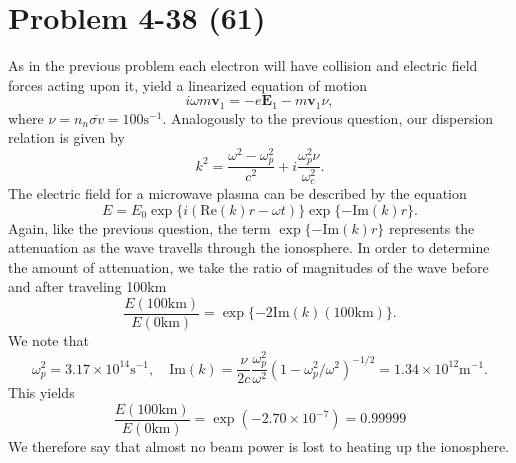 \section*{Problem 4-38 (61)}
\label{sec:4-38}
As in the previous problem each electron will have collision and electric field forces acting upon it, yield a linearized equation of motion
\begin{equation*}
i\omega m \bm{v}_1 = -e\bm{E}_1 - m \bm{v}_1\nu,
\end{equation*}
where \(\nu = n_n\overline{\sigma v} =100\text{s}^{-1}\). Analogously to the previous question, our dispersion relation is given by
\begin{equation*}
	k^2 = \dfrac{\omega^2 - \omega^2_p}{c^2} + i\dfrac{\omega^2_p\nu}{\omega^2_c}.
\end{equation*}
The electric field for a microwave plasma can be described by the equation
\begin{equation*}
	E = E_0\exp\{i\left(\text{Re}(k)r - \omega t \right) \}\exp\{-\text{Im}(k)r \}.
\end{equation*}
Again, like the previous question, the term \(\exp\{-\text{Im}(k)r \} \) represents the attenuation as the wave travells through the ionosphere. In order to determine the amount of attenuation, we take the ratio of magnitudes of the wave before and after traveling 100km 
\begin{equation*}
	\dfrac{E(100\text{km})}{E(0\text{km})} = \exp\{-2\text{Im}(k)(100\text{km}) \}.
\end{equation*}
We note that 
\begin{equation*}
	\omega^2_p = 3.17\times 10^{14}\text{s}^{-1}, \quad \text{Im}(k) = \dfrac{\nu}{2c}\dfrac{\omega^2_p}{\omega^2}\left(1 - \omega^2_p/\omega^2\right)^{-1/2} = 1.34\times 10^{12}\text{m}^{-1}.
\end{equation*}
This yields 
\begin{equation*}
	\dfrac{E(100\text{km})}{E(0\text{km})} = \exp(-2.70\times 10^{-7}) = 0.99999
\end{equation*}
We therefore say that almost no beam power is lost to heating up the ionosphere. 



